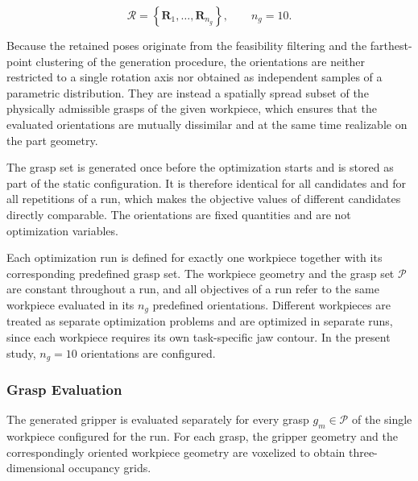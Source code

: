 \begin{equation}
    \mathcal{R}
    =
    \left\{
        \mathbf{R}_1,\ldots,\mathbf{R}_{n_g}
    \right\},
    \qquad
    n_g = 10.
\end{equation}


Because the retained poses originate from the feasibility filtering and the farthest-point
clustering of the generation procedure, the orientations are neither restricted to a single rotation
axis nor obtained as independent samples of a parametric distribution. They are instead a
spatially spread subset of the physically admissible grasps of the given workpiece, which ensures
that the evaluated orientations are mutually dissimilar and at the same time realizable on the part
geometry.

The grasp set is generated once before the optimization starts and is stored as part of the static
configuration. It is therefore identical for all candidates and for all repetitions of a run, which
makes the objective values of different candidates directly comparable. The orientations are fixed
quantities and are not optimization variables.

Each optimization run is defined for exactly one workpiece together with its corresponding
predefined grasp set. The workpiece geometry and the grasp set $\mathcal{P}$ are constant throughout
a run, and all objectives of a run refer to the same workpiece evaluated in its $n_g$ predefined
orientations. Different workpieces are treated as separate optimization problems and are optimized
in separate runs, since each workpiece requires its own task-specific jaw contour. In the present
study, $n_g = 10$ orientations are configured.


\subsubsection{Grasp Evaluation}
\label{sec:grasp_eval}

The generated gripper is evaluated separately for every grasp $g_m \in \mathcal{P}$ of the single
workpiece configured for the run. For each grasp, the gripper geometry and the correspondingly
oriented workpiece geometry are voxelized to obtain three-dimensional occupancy grids.

